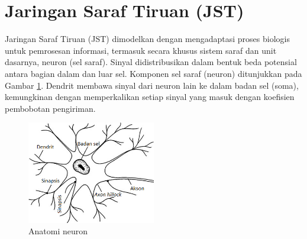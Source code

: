 

\section{Jaringan Saraf Tiruan (JST)}
Jaringan Saraf Tiruan (JST) dimodelkan dengan mengadaptasi proses biologis untuk pemrosesan informasi, termasuk secara khusus sistem saraf dan unit dasarnya, neuron (sel saraf). Sinyal didistribusikan dalam bentuk beda potensial antara bagian dalam dan luar sel. Komponen sel saraf (neuron) ditunjukkan pada Gambar \ref{fig:3:neuron}. Dendrit membawa sinyal dari neuron lain ke dalam badan sel (soma), kemungkinan dengan memperkalikan setiap sinyal yang masuk dengan koefisien pembobotan pengiriman. \cite{NNControlBook}

\begin{figure}[!h]
	\centering
	\includegraphics[width=0.5\textwidth]{figures/neuron}
	\caption{Anatomi neuron \cite{NNControlBook}}
	\label{fig:3:neuron}
\end{figure}

